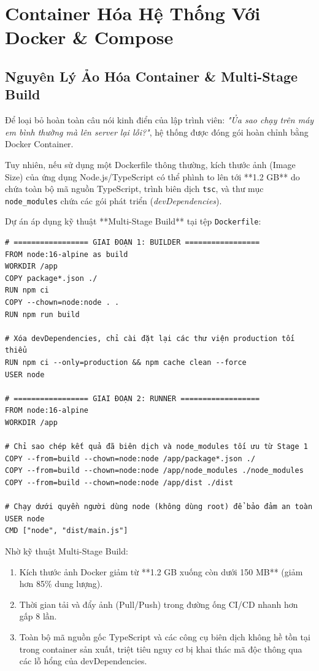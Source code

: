 \documentclass[12pt,a4paper,oneside]{book}
\begin{document}
\chapter{Container Hóa Hệ Thống Với Docker \& Compose}

\section{Nguyên Lý Ảo Hóa Container \& Multi-Stage Build}
Để loại bỏ hoàn toàn câu nói kinh điển của lập trình viên: \textit{"Ủa sao chạy trên máy em bình thường mà lên server lại lỗi?"}, hệ thống được đóng gói hoàn chỉnh bằng Docker Container.

Tuy nhiên, nếu sử dụng một Dockerfile thông thường, kích thước ảnh (Image Size) của ứng dụng Node.js/TypeScript có thể phình to lên tới **1.2 GB** do chứa toàn bộ mã nguồn TypeScript, trình biên dịch \texttt{tsc}, và thư mục \texttt{node\_modules} chứa các gói phát triển (\textit{devDependencies}).

Dự án áp dụng kỹ thuật **Multi-Stage Build** tại tệp \texttt{Dockerfile}:

\begin{codebox}
\begin{Verbatim}[fontsize=\small]
# ================= GIAI ĐOẠN 1: BUILDER =================
FROM node:16-alpine as build
WORKDIR /app
COPY package*.json ./
RUN npm ci
COPY --chown=node:node . .
RUN npm run build

# Xóa devDependencies, chỉ cài đặt lại các thư viện production tối thiểu
RUN npm ci --only=production && npm cache clean --force
USER node

# ================= GIAI ĐOẠN 2: RUNNER ==================
FROM node:16-alpine
WORKDIR /app

# Chỉ sao chép kết quả đã biên dịch và node_modules tối ưu từ Stage 1
COPY --from=build --chown=node:node /app/package*.json ./
COPY --from=build --chown=node:node /app/node_modules ./node_modules
COPY --from=build --chown=node:node /app/dist ./dist

# Chạy dưới quyền người dùng node (không dùng root) để bảo đảm an toàn
USER node
CMD ["node", "dist/main.js"]
\end{Verbatim}
\end{codebox}

\begin{infobox}
  Nhờ kỹ thuật Multi-Stage Build:
  \begin{enumerate}
    \item Kích thước ảnh Docker giảm từ **1.2 GB xuống còn dưới 150 MB** (giảm hơn 85\% dung lượng).
    \item Thời gian tải và đẩy ảnh (Pull/Push) trong đường ống CI/CD nhanh hơn gấp 8 lần.
    \item Toàn bộ mã nguồn gốc TypeScript và các công cụ biên dịch không hề tồn tại trong container sản xuất, triệt tiêu nguy cơ bị khai thác mã độc thông qua các lỗ hổng của devDependencies.
  \end{enumerate}
\end{infobox}
\end{document}

